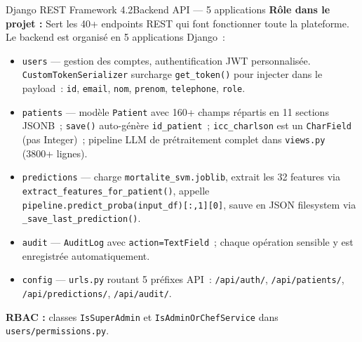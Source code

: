 \documentclass[12pt,a4paper]{article}
\begin{document}
\begin{toolbox}{Django REST Framework 4.2}{Backend API --- 5 applications}
\textbf{Rôle dans le projet :} Sert les 40+ endpoints REST qui font fonctionner
toute la plateforme. Le backend est organisé en 5 applications Django~:

\begin{itemize}[leftmargin=1.5em, itemsep=2pt]
  \item \texttt{users} --- gestion des comptes, authentification JWT personnalisée.
    \texttt{CustomTokenSerializer} surcharge \texttt{get\_token()} pour injecter
    dans le payload~: \texttt{id}, \texttt{email}, \texttt{nom}, \texttt{prenom},
    \texttt{telephone}, \texttt{role}.
  \item \texttt{patients} --- modèle \texttt{Patient} avec 160+ champs répartis en
    11 sections JSONB~; \texttt{save()} auto-génère \texttt{id\_patient}~;
    \texttt{icc\_charlson} est un \texttt{CharField} (pas Integer)~; pipeline LLM
    de prétraitement complet dans \texttt{views.py} (3800+ lignes).
  \item \texttt{predictions} --- charge \texttt{mortalite\_svm.joblib}, extrait
    les 32 features via \texttt{extract\_features\_for\_patient()}, appelle
    \texttt{pipeline.predict\_proba(input\_df)[:,1][0]}, sauve en JSON filesystem
    via \texttt{\_save\_last\_prediction()}.
  \item \texttt{audit} --- \texttt{AuditLog} avec \texttt{action=TextField}~;
    chaque opération sensible y est enregistrée automatiquement.
  \item \texttt{config} --- \texttt{urls.py} routant 5 préfixes API~:
    \texttt{/api/auth/}, \texttt{/api/patients/}, \texttt{/api/predictions/},
    \texttt{/api/audit/}.
\end{itemize}
\textbf{RBAC :} classes \texttt{IsSuperAdmin} et \texttt{IsAdminOrChefService}
dans \texttt{users/permissions.py}.
\end{toolbox}
\end{document}

